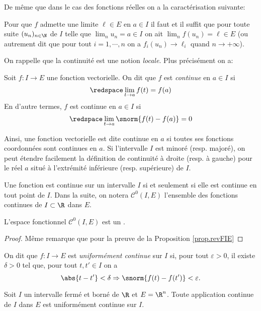 De même que dans le cas des fonctions réelles on a la caractérisation suivante:

\begin{proposition}
    Pour que $f$ admette une limite $\ell \in E$ en $a\in I$ il faut et il suffit que pour toute suite $(u_n)_{n\in\N}$ de $I$ telle que $\lim_n u_n = a \in I$ on ait $\lim_n f(u_n)= \ell \in E$ (ou autrement dit que pour tout $i=1,\cdots,n$ on a $f_i(u_n) \to \ell_i$ quand $n\to+\infty$). 
\end{proposition}

\sld{\vfill\pagebreak[5]}%
On rappelle que la continuité est une notion \emph{locale}. Plus précisément on a:
\begin{definition} 
	Soit $f:I\to E$ une fonction vectorielle. On dit que $f$ est \emph{continue} en $a\in I$ si 
\[ \redspace
	\lim_{t\to a }f(t)= f(a)
\]
En d'autre termes, $f$ est continue en $a\in I$  si
\[ \redspace
	\lim_{t\to a} \snorm{f(t) - f(a)} = 0
\]
\end{definition}
	Ainsi, une fonction vectorielle est dite continue en $a$ si toutes ses fonctions coordonnées sont continues en $a$. Si l'intervalle $I$ est minoré (resp. majoré), on peut étendre facilement la définition de continuité à droite (resp. à gauche) pour le réel $a$ situé à l'extrémité inférieure (resp. supérieure) de $I$.	
	
Une fonction est continue sur un intervalle $I$ si et seulement si elle est continue en tout point de $I$. Dans la suite, on notera $\mathcal C^0(I,E)$ l'ensemble des fonctions continues de $I\subset \R$ dans $E$.
	\begin{proposition}
		L'espace fonctionnel $\mathcal C^0(I,E)$ est un \rev.
	\end{proposition}

	\begin{proof}
	Même remarque que pour la preuve de la Proposition \ref{prop.revFIE}	
	\end{proof}

\sld{\vfill\pagebreak[5]}%
	\begin{definition}
		On dit que $f:I\to E$ est \emph{uniformément continue} sur $I$ si, pour tout $\varepsilon>0$, il existe $\delta>0$ tel que, pour tout $t,t'\in I$ on a 
		\[
			\abs{t-t'} <\delta \Rightarrow \snorm{f(t) - f(t')} < \varepsilon.
		\]
	\end{definition}

	\begin{proposition}
		Soit $I$ un intervalle fermé et borné de $\R$ et $E=\R^n$. Toute application continue de $I$ dans $E$ est uniformément continue sur $I$.
	\end{proposition}

